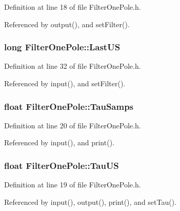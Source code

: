 Definition at line 18 of file Filter\+One\+Pole.\+h.



Referenced by output(), and set\+Filter().

\subsubsection[{\texorpdfstring{Last\+US}{LastUS}}]{\setlength{\rightskip}{0pt plus 5cm}long Filter\+One\+Pole\+::\+Last\+US}\hypertarget{struct_filter_one_pole_a1d54fb0cd986555060c80d2b502b4200}{}\label{struct_filter_one_pole_a1d54fb0cd986555060c80d2b502b4200}


Definition at line 32 of file Filter\+One\+Pole.\+h.



Referenced by input(), and set\+Filter().

\subsubsection[{\texorpdfstring{Tau\+Samps}{TauSamps}}]{\setlength{\rightskip}{0pt plus 5cm}float Filter\+One\+Pole\+::\+Tau\+Samps}\hypertarget{struct_filter_one_pole_a7d7271a45a4dbd1c0833c6f840199afc}{}\label{struct_filter_one_pole_a7d7271a45a4dbd1c0833c6f840199afc}


Definition at line 20 of file Filter\+One\+Pole.\+h.



Referenced by input(), and print().

\subsubsection[{\texorpdfstring{Tau\+US}{TauUS}}]{\setlength{\rightskip}{0pt plus 5cm}float Filter\+One\+Pole\+::\+Tau\+US}\hypertarget{struct_filter_one_pole_adbd63db9a63cdd75fea57ad393729d69}{}\label{struct_filter_one_pole_adbd63db9a63cdd75fea57ad393729d69}


Definition at line 19 of file Filter\+One\+Pole.\+h.



Referenced by input(), output(), print(), and set\+Tau().

